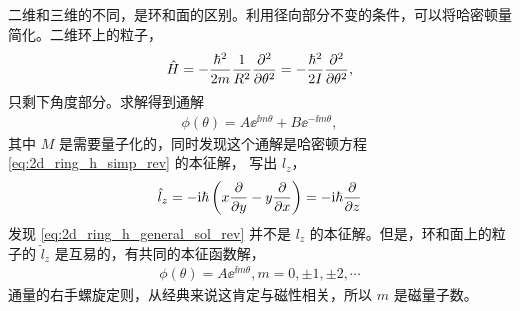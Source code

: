 二维和三维的不同，是环和面的区别。利用径向部分不变的条件，可以将哈密顿量简化。二维环上的粒子，
\begin{align}
    \hat H = - \frac{\hbar^2}{2m} \frac1{R^2} \pdv[2]{\theta} = - \frac{\hbar^2}{2I} \pdv[2]{\theta}, \label{eq:2d_ring_h_simp_rev}
\end{align}
只剩下角度部分。求解得到通解
\begin{align}
    \phi(\theta) = A \ee^{\ii m\theta} + B \ee^{-\ii m \theta},\label{eq:2d_ring_h_general_sol_rev}
\end{align}
其中 $M$ 是需要量子化的，同时发现这个通解是哈密顿方程 \eqref{eq:2d_ring_h_simp_rev} 的本征解，
写出 $l_z$，
\begin{align}
    \hat l_z = - \mathrm{i}\hbar \left(
        x \pdv{y} - y \pdv{x}
    \right) = -\mathrm{i}\hbar \pdv{z}
\end{align}
发现 \eqref{eq:2d_ring_h_general_sol_rev} 并不是 $l_z$ 的本征解。但是，环和面上的粒子的 $\hat l_z$ 是互易的，有共同的本征函数解，
\begin{align}
    \phi(\theta) = A\ee^{\ii m \theta}, m = 0,\pm1,\pm2,\cdots
\end{align}
通量的右手螺旋定则，从经典来说这肯定与磁性相关，所以 $m$ 是磁量子数。

